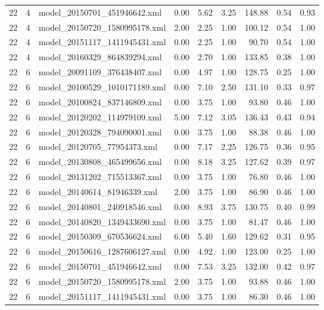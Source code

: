 \begin{table}[ht]
\begin{tabular}{rrlrrrrrr}
   22 &   4 & model\_20150701\_451946642.xml & 0.00 & 5.62 & 3.25 & 148.88 & 0.54 & 0.93 \\ 
   22 &   4 & model\_20150720\_1580995178.xml & 2.00 & 2.25 & 1.00 & 100.12 & 0.54 & 1.00 \\ 
   22 &   4 & model\_20151117\_1411945431.xml & 0.00 & 2.25 & 1.00 & 90.70 & 0.54 & 1.00 \\ 
   22 &   4 & model\_20160329\_864839294.xml & 0.00 & 2.70 & 1.00 & 133.85 & 0.38 & 1.00 \\ 
   22 &   6 & model\_20091109\_376438407.xml & 0.00 & 4.97 & 1.00 & 128.75 & 0.25 & 1.00 \\ 
   22 &   6 & model\_20100529\_1010171189.xml & 0.00 & 7.10 & 2.50 & 131.10 & 0.33 & 0.97 \\ 
   22 &   6 & model\_20100824\_837146809.xml & 0.00 & 3.75 & 1.00 & 93.80 & 0.46 & 1.00 \\ 
   22 &   6 & model\_20120202\_114979109.xml & 5.00 & 7.12 & 3.05 & 136.43 & 0.43 & 0.94 \\ 
   22 &   6 & model\_20120328\_794090001.xml & 0.00 & 3.75 & 1.00 & 88.38 & 0.46 & 1.00 \\ 
   22 &   6 & model\_20120705\_77954373.xml & 0.00 & 7.17 & 2.25 & 126.75 & 0.36 & 0.95 \\ 
   22 &   6 & model\_20130808\_465499656.xml & 0.00 & 8.18 & 3.25 & 127.62 & 0.39 & 0.97 \\ 
   22 &   6 & model\_20131202\_715513367.xml & 0.00 & 3.75 & 1.00 & 76.80 & 0.46 & 1.00 \\ 
   22 &   6 & model\_20140614\_81946339.xml & 2.00 & 3.75 & 1.00 & 86.90 & 0.46 & 1.00 \\ 
   22 &   6 & model\_20140801\_240918546.xml & 0.00 & 8.93 & 3.75 & 130.75 & 0.40 & 0.99 \\ 
   22 &   6 & model\_20140820\_1349433690.xml & 0.00 & 3.75 & 1.00 & 81.47 & 0.46 & 1.00 \\ 
   22 &   6 & model\_20150309\_670536624.xml & 6.00 & 5.40 & 1.60 & 129.62 & 0.31 & 0.95 \\ 
   22 &   6 & model\_20150616\_1287606127.xml & 0.00 & 4.92 & 1.00 & 123.00 & 0.25 & 1.00 \\ 
   22 &   6 & model\_20150701\_451946642.xml & 0.00 & 7.53 & 3.25 & 132.00 & 0.42 & 0.97 \\ 
   22 &   6 & model\_20150720\_1580995178.xml & 2.00 & 3.75 & 1.00 & 93.88 & 0.46 & 1.00 \\ 
   22 &   6 & model\_20151117\_1411945431.xml & 0.00 & 3.75 & 1.00 & 86.30 & 0.46 & 1.00 \\ 

\end{tabular}
\end{table}
